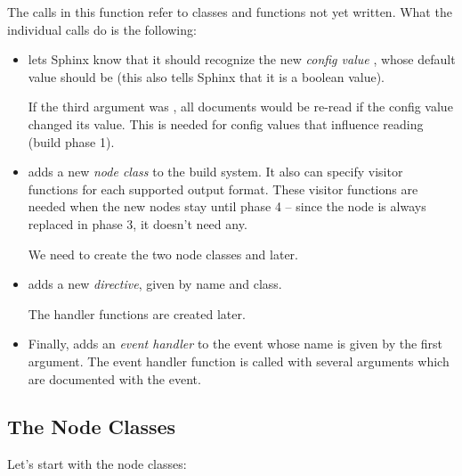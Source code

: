 \documentclass[letterpaper,10pt,english]{sphinxmanual}
\begin{document}
The calls in this function refer to classes and functions not yet written.  What
the individual calls do is the following:
\begin{itemize}
\item {} 
{\hyperref[ext/appapi:sphinx.application.Sphinx.add_config_value]{}} lets Sphinx know that it should recognize the
new \emph{config value} , whose default value should be
 (this also tells Sphinx that it is a boolean value).

If the third argument was , all documents would be re-read if the
config value changed its value.  This is needed for config values that
influence reading (build phase 1).

\item {} 
{\hyperref[ext/appapi:sphinx.application.Sphinx.add_node]{}} adds a new \emph{node class} to the build system.  It also
can specify visitor functions for each supported output format.  These visitor
functions are needed when the new nodes stay until phase 4 -- since the
 node is always replaced in phase 3, it doesn't need any.

We need to create the two node classes  and  later.

\item {} 
{\hyperref[ext/appapi:sphinx.application.Sphinx.add_directive]{}} adds a new \emph{directive}, given by name and class.

The handler functions are created later.

\item {} 
Finally, {\hyperref[ext/appapi:sphinx.application.Sphinx.connect]{}} adds an \emph{event handler} to the event whose
name is given by the first argument.  The event handler function is called
with several arguments which are documented with the event.

\end{itemize}


\subsection{The Node Classes}
\label{ext/tutorial:the-node-classes}
Let's start with the node classes:
\end{document}
